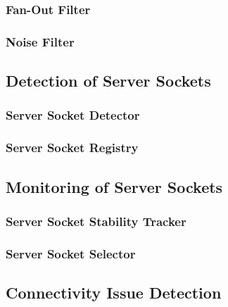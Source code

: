 \subsubsection{Fan-Out Filter}

\subsubsection{Noise Filter}

\subsection{Detection of Server Sockets} 
\subsubsection{Server Socket Detector}

\subsubsection{Server Socket Registry}

\subsection{Monitoring of Server Sockets} 
\subsubsection{Server Socket Stability
Tracker} 
\subsubsection{Server Socket Selector}

\subsection{Connectivity Issue Detection}
